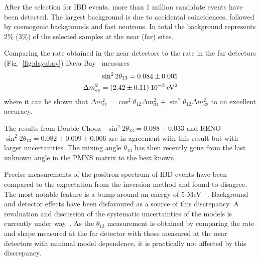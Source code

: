 After the selection for IBD events, more than 1 million candidate events have been detected. The largest background is due to accidental coincidences, followed by cosmogenic backgrounds and fast neutrons. In total the background represents 2\% (3\%) of the selected samples at the near (far) sites.

Comparing the rate obtained in the near detectors to the rate in the far detectors (Fig.~\ref{fig:dayabay}) Daya Bay~\cite{DBth13} measures 
\begin{eqnarray}
\sin^2 2 \theta_{13} = 0.084 \pm 0.005 \\
\Delta m^2_{ee} = (2.42 \pm 0.11) \: 10^{-3} \: {\rm eV^2}
\end{eqnarray}
where it can be shown that $\Delta m^2_{ee} = \cos^2 \theta_{12} \Delta m^2_{31} + \sin^2 \theta_{12} \Delta m^2_{32}$ to an excellent accuracy.

The results from Double Chooz~\cite{doublechou} 
$ \sin^2 2 \theta_{13}  = 0.088 \pm 0.033 $
and RENO~\cite{RENO} $ \sin^2 2 \theta_{13}  = 0.082 \pm 0.009 \pm 0.006 $ are in agreement with this result but with larger uncertainties. The mixing angle $\theta_{13}$ has then recently gone from the last unknown angle in the PMNS matrix to the best known.

Precise measurements of the positron spectrum of IBD events have been compared to the expectation from the inversion method and found to disagree. The most notable feature is a bump around an energy of 5 MeV ~\cite{DBflux}. Background and detector effects have been disfavoured as a source of this discrepancy. A revaluation and discussion of the systematic uncertainties of the models is currently under way~\cite{dwyer}.
As the $\theta_{13}$ measurement is obtained by comparing the rate and shape measured at the far detector with those measured at the near detectors with minimal model dependence, it is practically not affected by this discrepancy.



